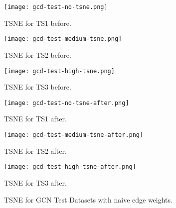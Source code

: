 \begin{figure}[htb]
  \centering
  \begin{minipage}{0.32\textwidth}
    \centering
    \texttt{[image: gcd-test-no-tsne.png]}
    \caption{TSNE for TS1 before.}
  \end{minipage}
  \begin{minipage}{0.32\textwidth}
    \centering
    \texttt{[image: gcd-test-medium-tsne.png]}
    \caption{TSNE for TS2 before.}
  \end{minipage}
  \begin{minipage}{0.32\textwidth}
    \centering
    \texttt{[image: gcd-test-high-tsne.png]}
    \caption{TSNE for TS3 before.}
  \end{minipage}
  \begin{minipage}{0.32\textwidth}
    \centering
    \texttt{[image: gcd-test-no-tsne-after.png]}
    \caption{TSNE for TS1 after.}
  \end{minipage}
  \begin{minipage}{0.32\textwidth}
    \centering
    \texttt{[image: gcd-test-medium-tsne-after.png]}
    \caption{TSNE for TS2 after.}
  \end{minipage}
  \begin{minipage}{0.32\textwidth}
    \centering
    \texttt{[image: gcd-test-high-tsne-after.png]}
    \caption{TSNE for TS3 after.}
  \end{minipage}
  \caption{TSNE for GCN Test Datasets with naive edge weights.}
  \label{fig:gcn-test-tsne}
\end{figure}

